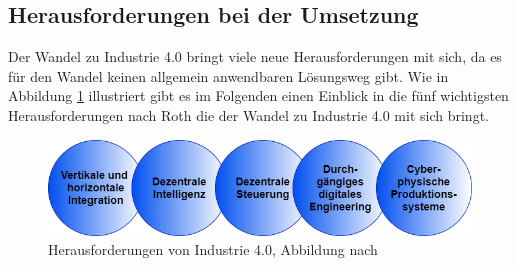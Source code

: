 \subsection{Herausforderungen bei der Umsetzung}\label{sec:HerausforderungenUmsetzung}
Der Wandel zu Industrie 4.0 bringt viele neue Herausforderungen mit sich, da es für den Wandel keinen allgemein anwendbaren Lösungsweg gibt. Wie in Abbildung \ref{fig:HerausforderungenIndustrie4.0} illustriert gibt es im Folgenden einen Einblick in die fünf wichtigsten Herausforderungen nach Roth \cite{14} die der Wandel zu Industrie 4.0 mit sich bringt.
\begin{figure}[h]
	\centering
	\includegraphics[width=1\linewidth]{Bilder/A11_HerausforderungenIndustrie4}
	\caption{Herausforderungen von Industrie 4.0, Abbildung nach \cite[S.37]{14}}
	\label{fig:HerausforderungenIndustrie4.0}
\end{figure}

